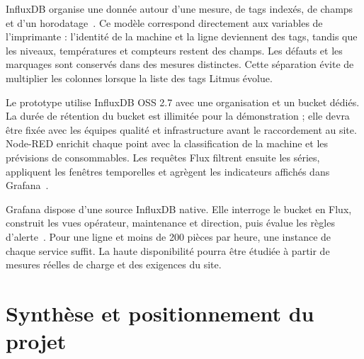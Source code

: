 InfluxDB organise une donnée autour d'une mesure, de tags indexés, de champs et
d'un horodatage~\cite{influxdb,influxschema}. Ce modèle correspond directement
aux variables de l'imprimante : l'identité de la machine et la ligne deviennent
des tags, tandis que les niveaux, températures et compteurs restent des champs.
Les défauts et les marquages sont conservés dans des mesures distinctes. Cette
séparation évite de multiplier les colonnes lorsque la liste des tags Litmus
évolue.

Le prototype utilise InfluxDB OSS 2.7 avec une organisation et un bucket dédiés.
La durée de rétention du bucket est illimitée pour la démonstration ; elle devra
être fixée avec les équipes qualité et infrastructure avant le raccordement au
site. Node-RED enrichit chaque point avec la classification de la machine et les
prévisions de consommables. Les requêtes Flux filtrent ensuite les séries,
appliquent les fenêtres temporelles et agrègent les indicateurs affichés dans
Grafana~\cite{flux}.

Grafana dispose d'une source InfluxDB native. Elle interroge le bucket en Flux,
construit les vues opérateur, maintenance et direction, puis évalue les règles
d'alerte~\cite{grafanainflux}. Pour une ligne et moins de 200 pièces par heure,
une instance de chaque service suffit. La haute disponibilité pourra être
étudiée à partir de mesures réelles de charge et des exigences du site.

\section{Synthèse et positionnement du projet}

